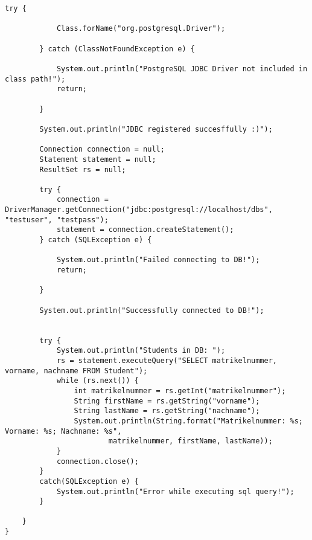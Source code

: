 \begin{itemize}
\begin{lstlisting}[style=java]
        try {

            Class.forName("org.postgresql.Driver");

        } catch (ClassNotFoundException e) {

            System.out.println("PostgreSQL JDBC Driver not included in class path!");
            return;

        }

        System.out.println("JDBC registered succesffully :)");

        Connection connection = null;
        Statement statement = null;
        ResultSet rs = null;

        try {
            connection = DriverManager.getConnection("jdbc:postgresql://localhost/dbs", "testuser", "testpass");
            statement = connection.createStatement();
        } catch (SQLException e) {

            System.out.println("Failed connecting to DB!");
            return;

        }

        System.out.println("Successfully connected to DB!");


        try {
            System.out.println("Students in DB: ");
            rs = statement.executeQuery("SELECT matrikelnummer, vorname, nachname FROM Student");
            while (rs.next()) {
                int matrikelnummer = rs.getInt("matrikelnummer");
                String firstName = rs.getString("vorname");
                String lastName = rs.getString("nachname");
                System.out.println(String.format("Matrikelnummer: %s; Vorname: %s; Nachname: %s",
                        matrikelnummer, firstName, lastName));
            }
            connection.close();
        }
        catch(SQLException e) {
            System.out.println("Error while executing sql query!");
        }

    }
}

\end{lstlisting}

\end{itemize}


